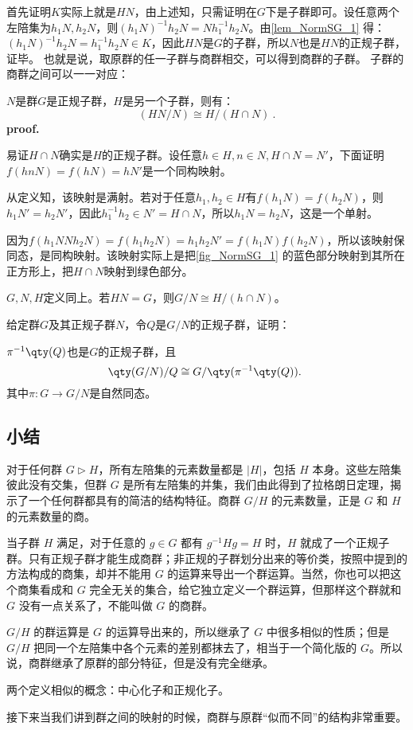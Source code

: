 首先证明$K$实际上就是$HN$，由上述知，只需证明在$G$下是子群即可。设任意两个左陪集为$h_1N,h_2N$，则$(h_1N)^{-1}h_2N=Nh_1^{-1}h_2N$。由\autoref{lem_NormSG_1} 得：$(h_1N)^{-1}h_2N=h_1^{-1}h_2N\in K$，因此$HN$是$G$的子群，所以$N$也是$HN$的正规子群，证毕。
也就是说，取原群的任一子群与商群相交，可以得到商群的子群。
子群的商群之间可以一一对应：
\begin{theorem}{}\label{the_NormSG_2}
$N$是群$G$是正规子群，$H$是另一个子群，则有：
\begin{equation}
(HN/N)\cong H/(H\cap N)~.
\end{equation}
\textbf{proof.}

易证$H\cap N$确实是$H$的正规子群。设任意$h\in H,n\in N,H\cap N=N'$，下面证明$f(hnN)=f(hN)=hN'$是一个同构映射。

从定义知，该映射是满射。若对于任意$h_1,h_2\in H$有$f(h_1N)=f(h_2N)$，则$h_1N'=h_2N'$，因此$h_1^{-1}h_2\in N'=H\cap N$，所以$h_1N=h_2N$，这是一个单射。

因为$f(h_1NNh_2N)=f(h_1h_2N)=h_1h_2N'=f(h_1N)f(h_2N)$，所以该映射保同态，是同构映射。该映射实际上是把\autoref{fig_NormSG_1} 的蓝色部分映射到其所在正方形上，把$H\cap N$映射到绿色部分。


\end{theorem}

\begin{corollary}{}
$G,N,H$定义同上。若$HN=G$，则$G/N\cong H/(h\cap N)$。
\end{corollary}




\begin{exercise}{}\label{exe_NormSG_2}
给定群$G$及其正规子群$N$，令$Q$是$G/N$的正规子群，证明：

$\pi^{-1}\qty(Q)$也是$G$的正规子群，且
\begin{equation}
    \qty(G/N)/Q \cong G/\qty(\pi^{-1}\qty(Q)). ~
\end{equation}
其中$\pi: G\to G/N$是自然同态。
\end{exercise}



\subsection{小结}
对于任何群 $G\vartriangleright H$，所有左陪集的元素数量都是 $|H|$，包括 $H$ 本身。这些左陪集彼此没有交集，但群 $G$ 是所有左陪集的并集，我们由此得到了拉格朗日定理，揭示了一个任何群都具有的简洁的结构特征。商群 $G/H$ 的元素数量，正是 $G$ 和 $H$ 的元素数量的商。

当子群 $H$ 满足，对于任意的 $g\in G$ 都有 $g^{-1}Hg=H$ 时，$H$ 就成了一个正规子群。只有正规子群才能生成商群；非正规的子群划分出来的等价类，按照中提到的方法构成的商集，却并不能用 $G$ 的运算来导出一个群运算。当然，你也可以把这个商集看成和 $G$ 完全无关的集合，给它独立定义一个群运算，但那样这个群就和 $G$ 没有一点关系了，不能叫做 $G$ 的商群。

$G/H$ 的群运算是 $G$ 的运算导出来的，所以继承了 $G$ 中很多相似的性质；但是 $G/H$ 把同一个左陪集中各个元素的差别都抹去了，相当于一个简化版的 $G$。所以说，商群继承了原群的部分特征，但是没有完全继承。

两个定义相似的概念：中心化子和正规化子。

接下来当我们讲到群之间的映射的时候，商群与原群“似而不同”的结构非常重要。
